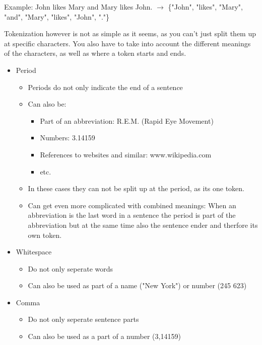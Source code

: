 \documentclass[
../../NLP4W_Summary.tex,
]
{subfiles}
\begin{document}
Example: John likes Mary and Mary likes John. $\rightarrow$ \{"John", "likes", "Mary", "and", "Mary", "likes", "John", "."\}

Tokenization however is not as simple as it seems, as you can't just split them up at specific characters. You also have to take into account the different meanings of the characters, as well as where a token starts and ends.
\begin{greenbox}
    \begin{itemize}
        \item Period
        \begin{itemize}
            \item Periods do not only indicate the end of a sentence
            \item Can also be:
            \begin{itemize}
                \item Part of an abbreviation: R.E.M. (Rapid Eye Movement)
                \item Numbers: 3.14159
                \item References to websites and similar: www.wikipedia.com
                \item etc.
            \end{itemize}
            \item In these cases they can not be split up at the period, as its one token.
            \item Can get even more complicated with combined meanings: When an abbreviation is the last word in a sentence the period is part of the abbreviation but at the same time also the sentence ender and therfore its own token.
        \end{itemize}
        \item Whitespace
        \begin{itemize}
            \item Do not only seperate words
            \item Can also be used as part of a name ("New York") or number (245 623)
        \end{itemize}
        \item Comma
        \begin{itemize}
            \item Do not only seperate sentence parts
            \item Can also be used as a part of a number (3,14159)
        \end{itemize}

\end{itemize}
\end{greenbox}
\end{document}
